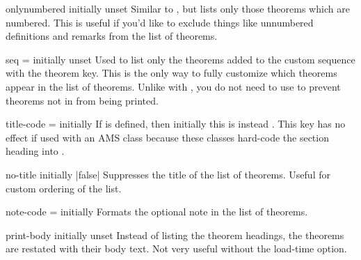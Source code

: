 \documentclass{ltxdoc}
\newcommand{\ttbraces}[1]{\braces{\texttt{#1}}}
\begin{document}
\begin{docKey}{onlynumbered}
  {}
  {initially unset}
Similar to , but lists only those theorems which are numbered.
This is useful if you'd like to exclude things like unnumbered definitions and remarks from the list of theorems.
\end{docKey}

\begin{docKey}[][doc label=listof/seq]{seq}
  {=}
  {initially unset}
Used to list only the theorems added to the custom sequence  with the  theorem key.
This is the only way to fully customize which theorems appear in the list of theorems.
Unlike with , you do not need to use  to prevent theorems not in  from being printed.
\end{docKey}

\begin{docKey}{title-code}
  {=}
  {initially \ttbraces{\#1}}
If  is defined, then initially this is instead \ttbraces{\#1}. This key has no effect if used with an AMS class because these classes hard-code the section heading into .
\end{docKey}

\begin{docKey}{no-title}
  {}
  {initially |false|}
Suppresses the title of the list of theorems.
Useful for custom ordering of the list.

\begin{keythmscode}[]
\listofkeytheorems[show=example]
\listofkeytheorems[show=solution,no-title]
\end{keythmscode}

\end{docKey}

\begin{docKey}{note-code}
  {=}
  {initially \ttbraces{ (\#1)}}
Formats the optional note in the list of theorems.
\end{docKey}

\begin{docKey}{print-body}
  {}
  {initially unset}
Instead of listing the theorem headings, the theorems are restated with their body text.
Not very useful without the  load-time option.
\end{docKey}
\end{document}
